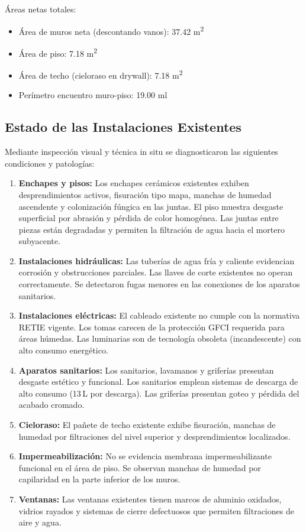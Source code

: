 ﻿\documentclass[12pt]{article}
\begin{document}
\noindent
{\'A}reas netas totales:
\begin{itemize}[noitemsep]
  \item {\'A}rea de muros neta (descontando vanos): 37.42 m\textsuperscript{2}
  \item {\'A}rea de piso: 7.18 m\textsuperscript{2}
  \item {\'A}rea de techo (cieloraso en drywall): 7.18 m\textsuperscript{2}
  \item Perímetro encuentro muro-piso: 19.00 ml
\end{itemize}

\subsection{Estado de las Instalaciones Existentes}

Mediante inspección visual y técnica in situ se diagnosticaron las siguientes
condiciones y patologías:

\begin{enumerate}[noitemsep]
  \item {\bfseries Enchapes y pisos:} Los enchapes cerámicos existentes exhiben desprendimientos
  activos, fisuración tipo mapa, manchas de humedad ascendente y colonización fúngica en las
  juntas. El piso muestra desgaste superficial por abrasión y pérdida de color homogénea.
  Las juntas entre piezas están degradadas y permiten la filtración de agua hacia el mortero
  subyacente.
  \item {\bfseries Instalaciones hidráulicas:} Las tuberías de agua fría y caliente evidencian
  corrosión y obstrucciones parciales. Las llaves de corte existentes no operan
  correctamente. Se detectaron fugas menores en las conexiones de los aparatos sanitarios.
  \item {\bfseries Instalaciones eléctricas:} El cableado existente no cumple con la normativa RETIE
  vigente. Los tomas carecen de la protección GFCI requerida para áreas húmedas. Las
  luminarias son de tecnología obsoleta (incandescente) con alto consumo energético.
  \item {\bfseries Aparatos sanitarios:} Los sanitarios, lavamanos y griferías presentan desgaste
  estético y funcional. Los sanitarios emplean sistemas de descarga de alto consumo (13\,L por
  descarga). Las griferías presentan goteo y pérdida del acabado cromado.
  \item {\bfseries Cieloraso:} El pañete de techo existente exhibe fisuración, manchas de humedad
  por filtraciones del nivel superior y desprendimientos localizados.
  \item {\bfseries Impermeabilización:} No se evidencia membrana impermeabilizante funcional en
  el área de piso. Se observan manchas de humedad por capilaridad en la parte inferior de los muros.
  \item {\bfseries Ventanas:} Las ventanas existentes tienen marcos de aluminio oxidados, vidrios
  rayados y sistemas de cierre defectuosos que permiten filtraciones de aire y agua.
\end{enumerate}
\end{document}
